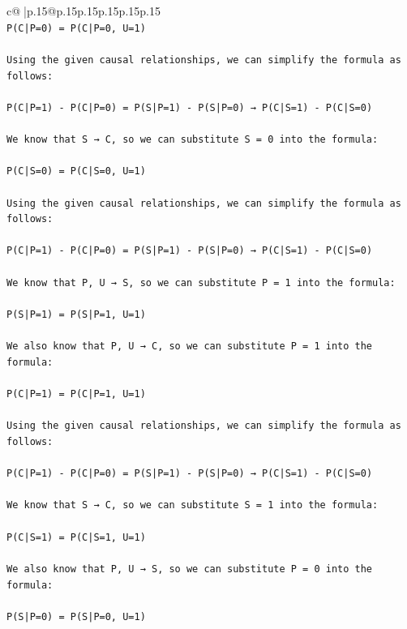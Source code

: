 \documentclass{article}
\begin{document}
{\begin{supertabular}{c@{$\;$}|p{.15\linewidth}@{}p{.15\linewidth}p{.15\linewidth}p{.15\linewidth}p{.15\linewidth}p{.15\linewidth}}
{{{\\ 
\texttt{P(C|P=0) = P(C|P=0, U=1)} \\
\\ 
\texttt{Using the given causal relationships, we can simplify the formula as follows:} \\
\\ 
\texttt{P(C|P=1) {-} P(C|P=0) = P(S|P=1) {-} P(S|P=0) → P(C|S=1) {-} P(C|S=0)} \\
\\ 
\texttt{We know that S → C, so we can substitute S = 0 into the formula:} \\
\\ 
\texttt{P(C|S=0) = P(C|S=0, U=1)} \\
\\ 
\texttt{Using the given causal relationships, we can simplify the formula as follows:} \\
\\ 
\texttt{P(C|P=1) {-} P(C|P=0) = P(S|P=1) {-} P(S|P=0) → P(C|S=1) {-} P(C|S=0)} \\
\\ 
\texttt{We know that P, U → S, so we can substitute P = 1 into the formula:} \\
\\ 
\texttt{P(S|P=1) = P(S|P=1, U=1)} \\
\\ 
\texttt{We also know that P, U → C, so we can substitute P = 1 into the formula:} \\
\\ 
\texttt{P(C|P=1) = P(C|P=1, U=1)} \\
\\ 
\texttt{Using the given causal relationships, we can simplify the formula as follows:} \\
\\ 
\texttt{P(C|P=1) {-} P(C|P=0) = P(S|P=1) {-} P(S|P=0) → P(C|S=1) {-} P(C|S=0)} \\
\\ 
\texttt{We know that S → C, so we can substitute S = 1 into the formula:} \\
\\ 
\texttt{P(C|S=1) = P(C|S=1, U=1)} \\
\\ 
\texttt{We also know that P, U → S, so we can substitute P = 0 into the formula:} \\
\\ 
\texttt{P(S|P=0) = P(S|P=0, U=1)} \\
\\ 
}}}
\end{supertabular}}
\end{document}
